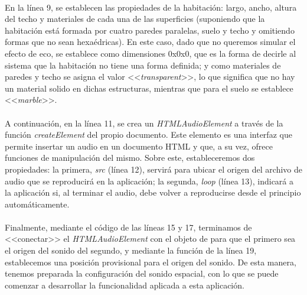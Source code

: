\documentclass{subfiles}
\begin{document}
        \paragraph{}
        En la línea 9, se establecen las propiedades de la habitación: largo, ancho, altura del techo y materiales de cada una de las superficies \cite{web:resonance_audio_utils} (suponiendo que la habitación está formada por cuatro paredes paralelas, suelo y techo y omitiendo formas que no sean hexaédricas). En este caso, dado que no queremos simular el efecto de eco, se establece como dimensiones 0x0x0, que es la forma de decirle al sistema que la habitación no tiene una forma definida; y como materiales de paredes y techo se asigna el valor <<\textit{transparent}>>, lo que significa que no hay un material solido en dichas estructuras, mientras que para el suelo se establece <<\textit{marble}>>.

        \paragraph{}
        A continuación, en la línea 11, se crea un \textit{HTMLAudioElement} \cite{web:mozilla_htmlaudioelement} a través de la función \textit{createElement} del propio documento. Este elemento es una interfaz que permite insertar un audio en un documento HTML y que, a su vez, ofrece funciones de manipulación del mismo. Sobre este, estableceremos dos propiedades: la primera, \textit{src} (línea 12), servirá para ubicar el origen del archivo de audio que se reproducirá en la aplicación; la segunda, \textit{loop} (línea 13), indicará a la aplicación si, al terminar el audio, debe volver a reproducirse desde el principio automáticamente.

        \paragraph{}
        Finalmente, mediante el código de las líneas 15 y 17, terminamos de <<conectar>> el \textit{HTMLAudioElement} con el objeto de \resonanceaudio para que el primero sea el origen del sonido del segundo, y mediante la función de la línea 19, establecemos una posición provisional para el origen del sonido. De esta manera, tenemos preparada la configuración del sonido espacial, con lo que se puede comenzar a desarrollar la funcionalidad aplicada a esta aplicación.
        
\end{document}
